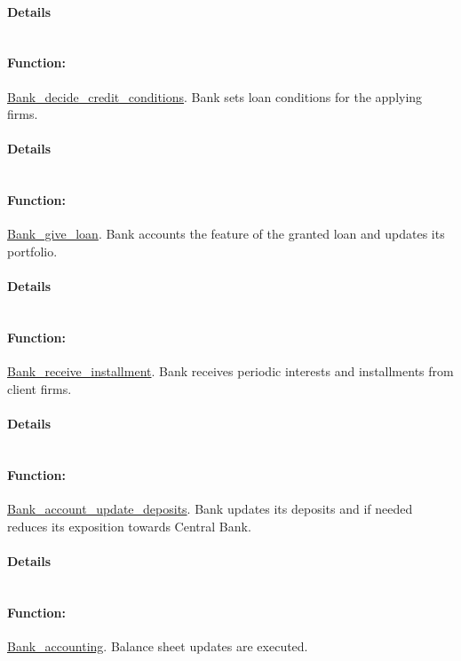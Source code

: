 \documentclass[a4paper,11pt]{article}
\begin{document}
\paragraph{Details}
\begin{verbatim}
\end{verbatim}
\paragraph{Function:}\url{Bank_decide_credit_conditions}.
Bank sets loan conditions for the applying firms.
\paragraph{Details}
\begin{verbatim}
\end{verbatim}
\paragraph{Function:}\url{Bank_give_loan}.
Bank accounts the feature of the granted loan and updates its portfolio.
\paragraph{Details}
\begin{verbatim}
\end{verbatim}
\paragraph{Function:}\url{Bank_receive_installment}.
Bank receives periodic interests and installments from client firms.
\paragraph{Details}
\begin{verbatim}
\end{verbatim}
\paragraph{Function:}\url{Bank_account_update_deposits}.
Bank updates its deposits and if needed reduces its exposition towards Central Bank.
\paragraph{Details}
\begin{verbatim}
\end{verbatim}
\paragraph{Function:}\url{Bank_accounting}.
Balance sheet updates are executed.
\end{document}
